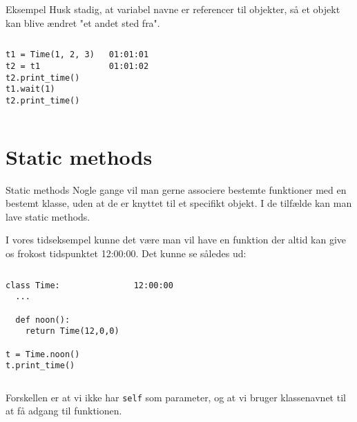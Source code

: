 \documentclass[main.tex]{subfiles}
\begin{document}
\begin{frame}[fragile]{Eksempel}
Husk stadig, at variabel navne er referencer til objekter, så et objekt kan blive ændret "et andet sted fra".
\begin{columns}
	\begin{lstlisting}[style=python]
t1 = Time(1, 2, 3)
t2 = t1
t2.print_time()
t1.wait(1)
t2.print_time()
	\end{lstlisting}
	\begin{lstlisting}[style=python]
01:01:01
01:01:02
	\end{lstlisting}
\end{columns}
\end{frame}


\section{Static methods}


\begin{frame}[fragile]{Static methods}
Nogle gange vil man gerne associere bestemte funktioner med en bestemt klasse, uden at de er knyttet til et specifikt objekt. I de tilfælde kan man lave static methods.

\pause
I vores tidseksempel kunne det være man vil have en funktion der altid kan give os frokost tidspunktet 12:00:00. Det kunne se således ud:
\begin{columns}
	\begin{lstlisting}[style=python]
class Time:
  ...
  
  def noon():
    return Time(12,0,0)

t = Time.noon()
t.print_time()
	\end{lstlisting}
	
	\begin{lstlisting}[style=python]
12:00:00
	\end{lstlisting}
\end{columns}

\pause
Forskellen er at vi ikke har \texttt{self} som parameter, og at vi bruger klassenavnet til at få adgang til funktionen.

\end{frame}
\end{document}
